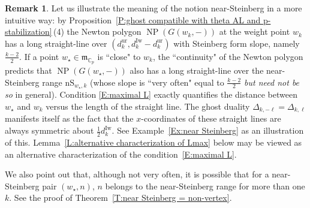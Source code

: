 \documentclass[12pt]{amsart}
\theoremstyle{definition}
\newtheorem{remark}[subsection]{Remark}
\numberwithin{equation}{subsection}
\def\gothm{\mathfrak{m}}
\def\CC{\mathbb{C}}
\DeclareMathOperator{\NP}{NP}
\newcommand{\Iw}{\mathrm{Iw}}
\newcommand{\unr}{\mathrm{ur}}
\newcommand{\nS}{\mathrm{nS}}
\begin{document}
\begin{remark}
\label{R:near-Steinberg explained}
Let us illustrate the meaning of the notion near-Steinberg in a more intuitive way: by Proposition~\ref{P:ghost compatible with theta AL and p-stabilization}\,(4) the Newton polygon $\NP(G(w_k,-))$ at the weight point $w_k$ has a long straight-line over $(d_{k}^\unr, d_{k}^\Iw - d_{k}^\unr)$ with Steinberg form slope, namely $\frac{k-2}2$.  If a point $w_\star \in \gothm_{\CC_p}$ is ``close" to $w_k$, the ``continuity" of the Newton polygon predicts that $\NP(G(w_\star, -))$ also has a long straight-line over the near-Steinberg range $\nS_{w_\star, k}$ (whose slope is ``very often" equal to $\frac{k-2}2$ \emph{but need not be so} in general). Condition \eqref{E:maximal L} exactly quantifies the distance between $w_\star$ and $w_k$ versus the length of the straight line. The ghost duality $\Delta_{k,-\ell} = \Delta_{k,\ell}$ manifests itself as the fact that the $x$-coordinates of these straight lines are always symmetric about $\frac 12d_k^\Iw$. See Example~\ref{Ex:near Steinberg} as an illustration of this. 
Lemma~\ref{L:alternative characterization of Lmax} below may be viewed as an alternative characterization of the condition~\eqref{E:maximal L}.

We also point out that, although not very often, it is possible that for a near-Steinberg pair $(w_\star, n)$,  $n$ belongs to the near-Steinberg range for more than one $k$. See the proof of Theorem~\ref{T:near Steinberg = non-vertex}.
\end{remark}
\end{document}
